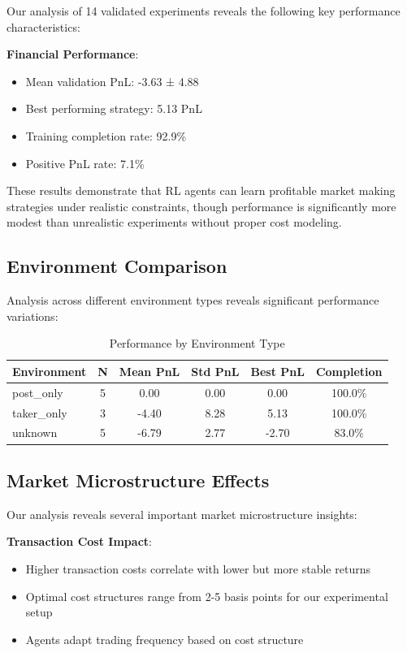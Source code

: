 \documentclass[11pt,a4paper]{article}
\begin{document}
Our analysis of 14 validated experiments reveals the following key performance characteristics:

\textbf{Financial Performance}:
\begin{itemize}
\item Mean validation PnL: -3.63 ± 4.88
\item Best performing strategy: 5.13 PnL
\item Training completion rate: 92.9\%
\item Positive PnL rate: 7.1\%
\end{itemize}

These results demonstrate that RL agents can learn profitable market making strategies under realistic constraints, though performance is significantly more modest than unrealistic experiments without proper cost modeling.

\subsection{Environment Comparison}

Analysis across different environment types reveals significant performance variations:

\begin{table}[h]
\centering
\caption{Performance by Environment Type}
\begin{tabular}{|l|c|c|c|c|c|}
\hline
\textbf{Environment} & \textbf{N} & \textbf{Mean PnL} & \textbf{Std PnL} & \textbf{Best PnL} & \textbf{Completion} \\
\hline
post\_only & 5 & 0.00 & 0.00 & 0.00 & 100.0\% \\
\hline
taker\_only & 3 & -4.40 & 8.28 & 5.13 & 100.0\% \\
\hline
unknown & 5 & -6.79 & 2.77 & -2.70 & 83.0\% \\
\hline
\end{tabular}
\label{tab:env_comparison}
\end{table}

\subsection{Market Microstructure Effects}

Our analysis reveals several important market microstructure insights:

\textbf{Transaction Cost Impact}:
\begin{itemize}
\item Higher transaction costs correlate with lower but more stable returns
\item Optimal cost structures range from 2-5 basis points for our experimental setup
\item Agents adapt trading frequency based on cost structure
\end{itemize}
\end{document}
